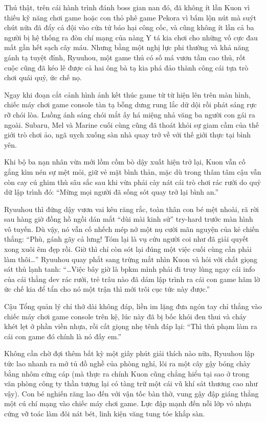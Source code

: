 \documentclass[../main.tex]{subfiles}
\begin{document}
Thú thật, trên cái hành trình đánh boss gian nan đó, đã không ít lần Kuon vì thiếu kỹ năng chơi game hoặc con thỏ phê game Pekora vì bấm lộn nút mà suýt chút nữa đã đẩy cả đội vào cửa tử báo hại công cốc, và cũng không ít lần cả ba người bị hệ thống ra đòn chí mạng của nàng Y tá kia chơi cho những vố cực đau mất gần hết sạch cây máu. Nhưng bằng một nghị lực phi thường và khả năng gánh tạ tuyệt đỉnh, Ryuuhou, một game thủ có số má vươn tầm cao thủ, rốt cuộc cũng đã kéo lê được cả hai ông bà tạ kia phá đảo thành công cái tựa trò chơi quái quỷ, ức chế nọ.

Ngay khi đoạn cắt cảnh hình ảnh kết thúc game từ từ hiện lên trên màn hình, chiếc máy chơi game console tàn tạ bỗng dưng rung lắc dữ dội rồi phát sáng rực rỡ chói lòa. Luồng ánh sáng chói mắt ấy há miệng nhả văng ba người con gái ra ngoài. Subaru, Mel và Marine cuối cùng cũng đã thoát khỏi sự giam cầm của thế giới trò chơi ảo, ngã uỵch xuống sàn nhà quay trở về với thế giới thực tại bình yên.


Khi bộ ba nạn nhân vừa mới lồm cồm bò dậy xuất hiện trở lại, Kuon vẫn cố gắng kìm nén sự mệt mỏi, giữ vẻ mặt bình thản, mặc dù trong thâm tâm cậu vẫn còn cay cú ghim thù sâu sắc sau khi vừa phải cày nát cái trò chơi rác rưởi do quỷ dữ lập trình đó: ``Mừng mọi người đã sống sót quay trở lại bình an.''

Ryuuhou thì đứng dậy vươn vai kêu răng rắc, toàn thân con bé mệt nhoài, rã rời sau hàng giờ đồng hồ ngồi dán mắt ``dùi mài kinh sử'' try-hard trước màn hình vô tuyến. Dù vậy, nó vẫn cố nhếch mép nở một nụ cười mãn nguyện của kẻ chiến thắng: ``Phù, gánh gãy cả lưng! Tóm lại là vụ cứu người coi như đã giải quyết xong xuôi êm đẹp rồi. Giờ thì chỉ còn sót lại đúng một việc cuối cùng cần phải làm thôi\dots'' Ryuuhou quay phắt sang trừng mắt nhìn Kuon và hỏi với chất giọng sát thủ lạnh tanh: ``\dots Việc bây giờ là bpkm mình phải đi truy lùng ngay cái info của cái thằng dev rác rưởi, trẻ trâu nào đã dám lập trình ra cái con game hãm lờ ức chế kia để tẩn cho nó một trận thì mới trôi cục tức này được.''

Cậu Tổng quản lý chỉ thở dài không đáp, liền im lặng đưa ngón tay chỉ thẳng vào chiếc máy chơi game console trên kệ, lúc này đã bị bốc khói đen thui và cháy khét lẹt ở phần viền nhựa, rồi cất giọng nhẹ tênh đáp lại: ``Thì thủ phạm làm ra cái con game đó chính là nó đấy em.''

Không cần chờ đợi thêm bất kỳ một giây phút giải thích nào nữa, Ryuuhou lập tức lao nhanh ra mở tủ đồ nghề của phòng nghỉ, lôi ra một cây gậy bóng chày bằng nhôm cứng cáp (mà thực ra chính Kuon cũng chẳng hiểu tại sao ở trong văn phòng công ty thần tượng lại có tàng trữ một cái vũ khí sát thương cao như vậy). Con bé nghiến răng lao đến với vận tốc bàn thờ, vung gậy đập giáng thẳng một cú chí mạng vào chiếc máy chơi game. Lực đập mạnh đến nỗi lớp vỏ nhựa cứng vỡ toác làm đôi nát bét, linh kiện văng tung tóe khắp sàn.
\end{document}

